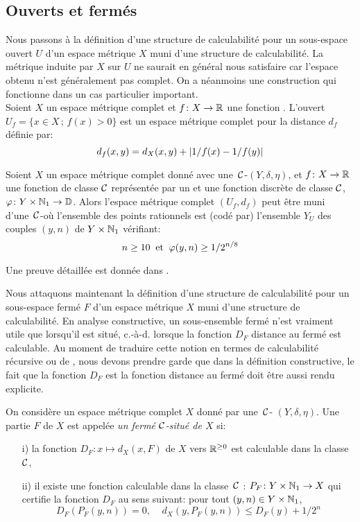 \subsection {Ouverts et fermés} \label{fsubsec25}
Nous passons à la définition d'une structure de calculabilité pour un 
sous-espace ouvert $U$ d'un espace métrique $X$ muni d'une structure de 
calculabilité. La métrique induite par $X$ sur $U$ ne saurait en général 
nous satisfaire car l'espace obtenu n'est généralement pas complet. On a 
néanmoins une construction qui fonctionne dans un cas particulier important.\\ 
Soient $X$ un espace métrique complet et   $f\colon  X \rightarrow \mathbb {R}$  une 
fonction 
\loca \unico.  L'ouvert  $U_f = \{x \in X\,;\, f(x) > 0 \}$  est un espace 
métrique complet pour la distance  $d_f$  définie par:		
$$d_f(x,y) = d_X(x,y) + \left|{1/f(x) - 1/f(y)}\right|$$

\begin{fpropdef} \label{f251}
Soient $X$ un espace métrique complet donné avec une~${{\cal C}}$-\pres $(Y, 
\delta, \eta)$, et   $f\colon  X \rightarrow \mathbb {R}$  une fonction \loca \uni de classe  
${{\cal C}}$    représentée par un \mcu et une fonction discrète de classe  
${{\cal C}}$,
$ \varphi \colon  Y \times \mathbb {N}_1 \rightarrow \mathbb {D}$. Alors l'espace métrique complet  
$(U_f, d_f)$ peut être muni d'une~${{\cal C}}$-\pres où l'ensemble des points 
rationnels est (codé par) l'ensemble  $Y_U$ des couples  $(y,n)$  de  $Y 
\times  \mathbb {N}_1$  vérifiant:		$$n \geq 10 \; \; \hbox{et} \; \; 
\varphi(y,n) \geq 1/2^{n/8}$$
\end{fpropdef}

\proof Une preuve détaillée est donnée dans \cite{fMo}.\eop

\medskip Nous attaquons maintenant la définition d'une structure de calculabilité 
pour un sous-espace fermé $F$ d'un espace métrique $X$ muni d'une structure 
de calculabilité. En analyse constructive, un sous-ensemble fermé n'est 
vraiment utile que lorsqu'il est situé, c.-à-d. lorsque la fonction  $D_F$  
distance au fermé est calculable. 
Au moment de traduire cette notion en termes de calculabilité récursive ou de \com, nous devons prendre garde que dans la définition constructive, le fait que la fonction  $D_F$  est la fonction distance au fermé doit être aussi rendu explicite.

\begin{fdefinition} \label{f252}
On considère un espace métrique complet $X$ donné par une~${{\cal C}}$-\pres  
$(Y, \delta, \eta)$.  Une partie  $F$  de $X$ est appelée {\em un fermé 
${{\cal C}}$-situé de $X$}  si:
\begin{itemize}
%
\item [i)]	la fonction  $D_F\colon   x \mapsto d_X(x,F)$   de $X$ vers  $\mathbb {R}^{\geq 0}$   est 
calculable dans la classe~${{\cal C}}$,
%
\item [ii)]	il existe une fonction calculable dans la classe~${{\cal C}}$ :    $P_F \colon  Y 
\times \mathbb {N}_1\rightarrow X$ qui certifie la fonction  $D_F$  au sens suivant: pour tout   $(y,n) \in  Y \times  \mathbb {N}_1$,
\[
D_F(P_F(y,n)) = 0,\; \; \; \;  d_X(y,P_F(y,n)) \leq D_F(y) + 1/2^n 
\] 
%
\end{itemize}
\end{fdefinition}

